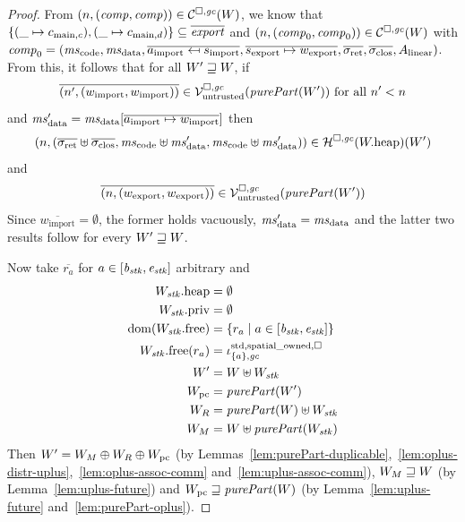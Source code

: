 \documentclass[a4paper]{article}
\begin{document}
\begin{proof}
  From $\left(n,(\mathit{comp},\mathit{comp})\right) \in \mathcal{C}^{\square,\mathit{gc}}(W)$, we know that
  $\{(\_ \mapsto c_{\mathrm{main},c}), (\_ \mapsto c_{\mathrm{main},d})\}\subseteq \overline{\mathit{export}}$ and 
  $\left(n,(\mathit{comp}_0,\mathit{comp}_0)\right) \in \mathcal{C}^{\square,\mathit{gc}}(W)$ with $\var{comp}_0 = (\mscode, \msdata, \overline{a_{\mathrm{import}}\mapsfrom s_{\mathrm{import}}}, \overline{s_{\mathrm{export}}\mapsto w_{\mathrm{export}}}, \sigrets, \sigcloss,A_\linear)$.
  From this, it follows that for all  $W' \sqsupseteq W$, if
  \begin{equation*}
    \overline{\npair[n']{(w_{\mathrm{import}},w_{\mathrm{import}})}} \in \lrv(\purePart{W'}) \text{ for all $n' < n$}
  \end{equation*}
  and $\msdata' = \msdata{}[\overline{a_{\mathrm{import}} \mapsto w_{\mathrm{import}}}]$
  then
  \begin{equation*}
    \npair{(\sigrets\uplus\sigcloss,\mscode\uplus \msdata', \mscode\uplus\msdata')} \in \lrheap(\pwheap)(W')
  \end{equation*}
  and
  \begin{equation*}
    \overline{\npair{(w_{\mathrm{export}},w_{\mathrm{export}})}} \in \lrv(\purePart{W'})
  \end{equation*}
  Since $\overline{w_{\mathrm{import}}} = \emptyset$, the former holds vacuously, $\msdata' = \msdata$ and the latter two results follow for every $W' \sqsupseteq W$.
  
  Now take $\overline{r_a}$ for $a \in [\mathit{b}_{\mathit{stk}},\mathit{e}_{\mathit{stk}}]$ arbitrary and 
  \begin{align*}
    \pwheap[W_\stk] &= \emptyset\\
    \pwpriv[W_\stk] &= \emptyset\\
    \dom(\pwfree[W_\stk]) &= \{r_a \mid a \in [\baddr_\stk,\eaddr_\stk]\}\\
    \pwfree[W_\stk](r_a) &= \stdreg{\{a\},\gc}{\spatialo}\\
    W' &= W \uplus W_\stk\\
    W_\pcreg &= \purePart{W'}\\
    W_R &= \purePart{W} \uplus W_\stk\\
    W_M &= W \uplus \purePart{W_\stk}
  \end{align*}
  Then $W' = W_M \oplus W_R \oplus W_{\mathrm{pc}}$ (by Lemmas~\ref{lem:purePart-duplicable},~\ref{lem:oplus-distr-uplus},~\ref{lem:oplus-assoc-comm} and~\ref{lem:uplus-assoc-comm}), $W_M \sqsupseteq W$ (by Lemma~\ref{lem:uplus-future}) and $W_\pcreg \future \purePart{W}$ (by Lemma~\ref{lem:uplus-future} and~\ref{lem:purePart-oplus}).


\end{proof}
\end{document}
